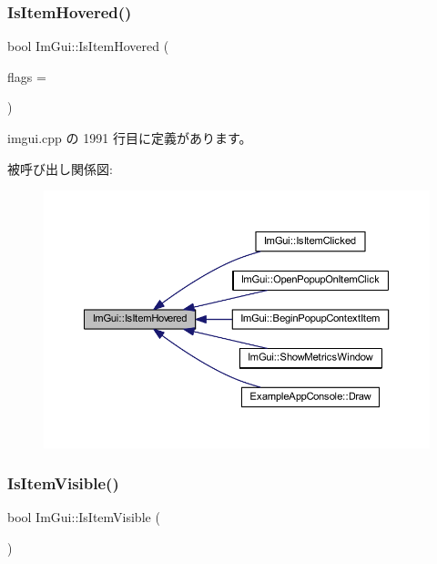 \subsubsection{\texorpdfstring{Is\+Item\+Hovered()}{IsItemHovered()}}
{\footnotesize\ttfamily bool Im\+Gui\+::\+Is\+Item\+Hovered (\begin{DoxyParamCaption}\item[{\mbox{\hyperlink{imgui_8h_a3a8f688665e5ea0bd9700e1251580a2c}{Im\+Gui\+Hovered\+Flags}}}]{flags = {} }\end{DoxyParamCaption})}



 imgui.\+cpp の 1991 行目に定義があります。

被呼び出し関係図\+:\nopagebreak
\begin{figure}[H]
\begin{center}
\leavevmode
\includegraphics[width=350pt]{namespace_im_gui_ac9a400eff3a9561d95e80486c52a660b_icgraph}
\end{center}
\end{figure}
\mbox{\label{namespace_im_gui_a0e9273fc53bdf7ca39d59cdb657c3c2f}} 
\subsubsection{\texorpdfstring{Is\+Item\+Visible()}{IsItemVisible()}}
{\footnotesize\ttfamily bool Im\+Gui\+::\+Is\+Item\+Visible (\begin{DoxyParamCaption}{ }\end{DoxyParamCaption})}




